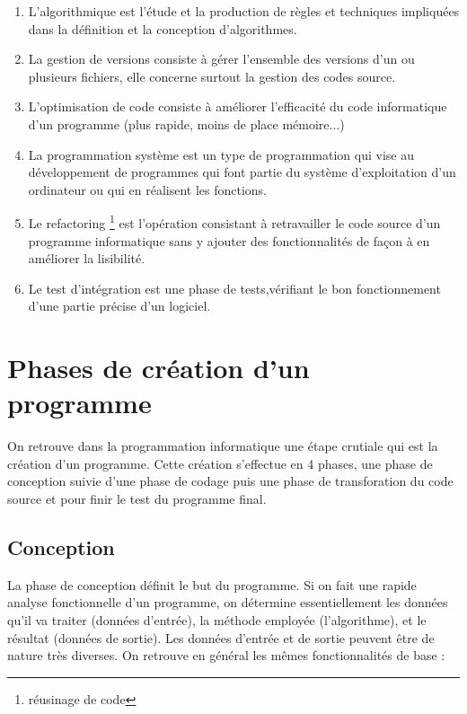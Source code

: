 \documentclass[12pt,a4paper]{article}
\begin{document}
    \begin{enumerate}[leftmargin=30px]
        \item L'algorithmique est l'étude et la production de règles et techniques impliquées dans la définition et la conception d'algorithmes.
        \item La gestion de versions consiste à gérer l'ensemble des versions d'un ou plusieurs fichiers, elle concerne surtout la gestion des codes source. 
        \item L'optimisation de code consiste à améliorer l'efficacité du code informatique d'un programme (plus rapide, moins de place mémoire...)
        \item La programmation système est un type de programmation qui vise au développement de programmes qui font partie du système d’exploitation d’un ordinateur ou qui en réalisent les fonctions.
        \item Le refactoring \footnote{réusinage de code} est l'opération consistant à retravailler le code source d'un programme informatique sans y ajouter des fonctionnalités de façon à en améliorer la lisibilité.
        \item Le test d'intégration est une phase de tests,vérifiant le bon fonctionnement d'une partie précise d'un logiciel.
    \end{enumerate}
    
    
    \section{Phases de création d'un programme}
    On retrouve dans la programmation informatique une étape crutiale qui est la création d'un programme. Cette création s'effectue en 4 phases, une phase de conception suivie d'une phase de codage puis une phase de transforation du code source et pour finir le test du programme final.
    
    
    \newpage
    
    
    \subsection{Conception}
    La phase de conception définit le but du programme. Si on fait une rapide analyse fonctionnelle d'un programme, on détermine essentiellement les données qu'il va traiter (données d'entrée), la méthode employée (l'algorithme), et le résultat (données de sortie). Les données d'entrée et de sortie peuvent être de nature très diverses. On retrouve en général les mêmes fonctionnalités de base :\\
    
\end{document}

